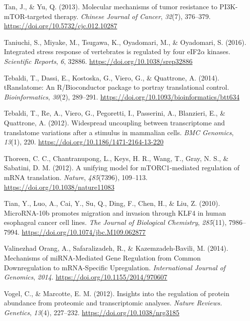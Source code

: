 \documentclass[12pt,openany]{book}
\begin{document}
\hypertarget{ref-Tan2013}{}
Tan, J., \& Yu, Q. (2013). Molecular mechanisms of tumor resistance to
PI3K-mTOR-targeted therapy. \emph{Chinese Journal of Cancer},
\emph{32}(7), 376--379. \url{https://doi.org/10.5732/cjc.012.10287}

\hypertarget{ref-Taniuchi2016}{}
Taniuchi, S., Miyake, M., Tsugawa, K., Oyadomari, M., \& Oyadomari, S.
(2016). Integrated stress response of vertebrates is regulated by four
eIF2\(\alpha\) kinases. \emph{Scientific Reports}, \emph{6}, 32886.
\url{https://doi.org/10.1038/srep32886}

\hypertarget{ref-Tebaldi2014}{}
Tebaldi, T., Dassi, E., Kostoska, G., Viero, G., \& Quattrone, A.
(2014). tRanslatome: An R/Bioconductor package to portray translational
control. \emph{Bioinformatics}, \emph{30}(2), 289--291.
\url{https://doi.org/10.1093/bioinformatics/btt634}

\hypertarget{ref-Tebaldi2012}{}
Tebaldi, T., Re, A., Viero, G., Pegoretti, I., Passerini, A., Blanzieri,
E., \& Quattrone, A. (2012). Widespread uncoupling between transcriptome
and translatome variations after a stimulus in mammalian cells.
\emph{BMC Genomics}, \emph{13}(1), 220.
\url{https://doi.org/10.1186/1471-2164-13-220}

\hypertarget{ref-Thoreen2012}{}
Thoreen, C. C., Chantranupong, L., Keys, H. R., Wang, T., Gray, N. S.,
\& Sabatini, D. M. (2012). A unifying model for mTORC1-mediated
regulation of mRNA translation. \emph{Nature}, \emph{485}(7396),
109--113. \url{https://doi.org/10.1038/nature11083}

\hypertarget{ref-Tian2010}{}
Tian, Y., Luo, A., Cai, Y., Su, Q., Ding, F., Chen, H., \& Liu, Z.
(2010). MicroRNA-10b promotes migration and invasion through KLF4 in
human esophageal cancer cell lines. \emph{The Journal of Biological
Chemistry}, \emph{285}(11), 7986--7994.
\url{https://doi.org/10.1074/jbc.M109.062877}

\hypertarget{ref-ValinezhadOrang2014}{}
Valinezhad Orang, A., Safaralizadeh, R., \& Kazemzadeh-Bavili, M.
(2014). Mechanisms of miRNA-Mediated Gene Regulation from Common
Downregulation to mRNA-Specific Upregulation. \emph{International
Journal of Genomics}, \emph{2014}.
\url{https://doi.org/10.1155/2014/970607}

\hypertarget{ref-Vogel2012}{}
Vogel, C., \& Marcotte, E. M. (2012). Insights into the regulation of
protein abundance from proteomic and transcriptomic analyses.
\emph{Nature Reviews. Genetics}, \emph{13}(4), 227--232.
\url{https://doi.org/10.1038/nrg3185}
\end{document}
